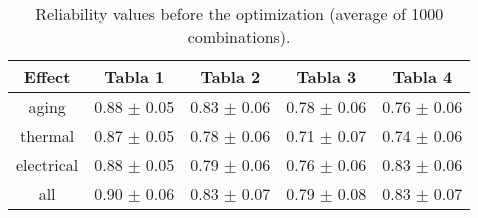 \begin{table}
  \centering
  
  \caption{Reliability values before the optimization (average of 1000 combinations).}
  \label{tab:rel_no_optimization}
\begin{tabular}{c c c c c }
\hline
Effect & Tabla 1 & Tabla 2 & Tabla 3 & Tabla 4 \\
\hline
aging & 0.88 $\pm$ 0.05 & 0.83 $\pm$ 0.06 & 0.78 $\pm$ 0.06 & 0.76 $\pm$ 0.06 \\
thermal & 0.87 $\pm$ 0.05 & 0.78 $\pm$ 0.06 & 0.71 $\pm$ 0.07 & 0.74 $\pm$ 0.06 \\
electrical & 0.88 $\pm$ 0.05 & 0.79 $\pm$ 0.06 & 0.76 $\pm$ 0.06 & 0.83 $\pm$ 0.06 \\
all & 0.90 $\pm$ 0.06 & 0.83 $\pm$ 0.07 & 0.79 $\pm$ 0.08 & 0.83 $\pm$ 0.07 \\
\hline
\end{tabular}
\end{table}